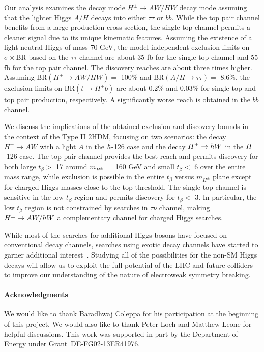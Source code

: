 Our analysis examines the decay mode $H^{\pm} \rightarrow AW/HW$ decay mode assuming that the lighter Higgs $A/H$ decays into either $\tau\tau$ or $bb$. While the top pair channel benefits from a large production cross section, the single top channel permits a cleaner signal due to its unique kinematic features. Assuming the existence of a light neutral Higgs of mass 70 GeV, the model independent exclusion limits on $\sigma\times$BR based on the $\tau\tau$ channel are about 35 fb for the single top channel and 55 fb for the top pair channel. The discovery reaches are about three times higher. Assuming $\text{BR}(H^{\pm} \rightarrow AW/HW)=$ 100\% and $\text{BR}(A/H \rightarrow \tau\tau)=$ 8.6\%, the exclusion limits on $\text{BR}(t \rightarrow H^+ b)$ are about 0.2\% and 0.03\% for single top and top pair production, respectively. A significantly worse reach is obtained in the $bb$ channel. 

We discuss the implications of the obtained exclusion and discovery bounds in the context of the Type II $2$HDM, focusing on two scenarios: the decay $H^{\pm} \rightarrow AW$ with a light $A$ in the $h$-126 case and the decay $H^{\pm} \rightarrow h W$ in the $H$-126 case.  The top pair channel provides the best reach and permits discovery for both large $t_{\beta}>$ 17 around $m_{H^{\pm}}=$ 160 GeV and small $t_{\beta}<$ 6 over the entire mass range, while exclusion is possible in the entire $t_{\beta}$ versus $m_{H^{\pm}}$ plane except for charged Higgs masses close to the top threshold. The single top channel is sensitive in the low $t_{\beta}$ region and permits discovery for $t_{\beta}<$ 3. In particular, the low $t_{\beta}$ region is not constrained by searches in $\tau\nu$ channel, making $H^{\pm} \rightarrow AW/h W$ a complementary channel for charged Higgs searches.

While most of the searches for additional Higgs bosons have focused on conventional decay channels, searches using exotic decay channels have started to garner additional interest~\cite{Curtin:2013fra, Brownson:2013lka, Coleppa:2014hxa, Coleppa:2014cca,Li:2015lra,Dorsch:2014qja,Chen:2013emb,Chen:2014dma,Enberg:2014pua,CMS:2014yra,Aad:2015wra,CMS:2013eua}. Studying all of the possibilities for the non-SM Higgs decays will allow us to exploit the full potential of the LHC and future colliders to improve our understanding of the nature of electroweak symmetry breaking.
\paragraph{Acknowledgments}
We would like to thank Baradhwaj Coleppa for his participation at the beginning of this project. We would also like to thank Peter Loch and Matthew Leone for helpful discussions. This work was supported in part by the Department of Energy under Grant~DE-FG02-13ER41976. 
